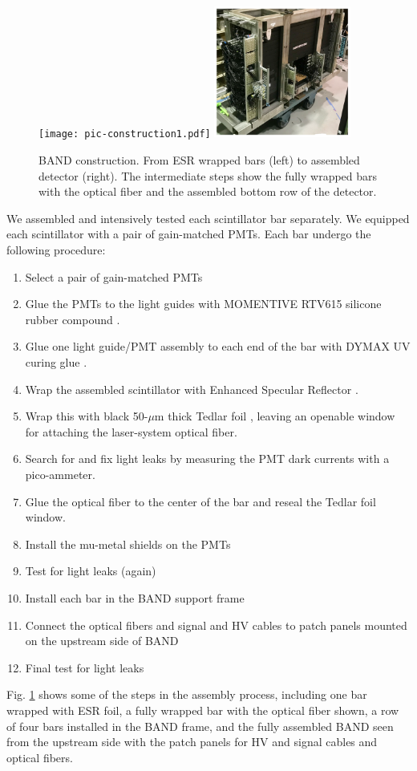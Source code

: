 \documentclass[3p,final,twocolumn]{elsarticle}
\begin{document}
\begin{figure}[tbp]
	\centering
	\texttt{[image: pic-construction1.pdf]}
	\includegraphics[width=0.40\textwidth , height=0.40\textwidth]{pic-construction2.pdf}
				\caption{BAND construction. From ESR \cite{3MESR} wrapped bars (left) to assembled detector (right). The intermediate steps show the fully wrapped bars with the optical fiber and the assembled bottom row of the detector.}
		\label{fig:barassembly}
\end{figure}

We assembled and intensively tested each scintillator bar
separately. We equipped each scintillator with a pair of gain-matched
PMTs.  Each bar undergo the following procedure:
\begin{enumerate}
\item Select a pair of gain-matched PMTs
\item Glue the PMTs to the light guides with MOMENTIVE RTV615 silicone rubber compound \cite{softglue}.
\item Glue one light guide/PMT assembly to each end of the bar with DYMAX
  UV curing glue \cite{uvglue}.
\item Wrap the assembled scintillator with Enhanced Specular Reflector \cite{3MESR}.
\item Wrap this with black 50-$\mu$m thick Tedlar foil \cite{tedlarfoil}, leaving an openable
  window for attaching the laser-system optical fiber.
\item Search for and fix light leaks by measuring the PMT dark currents with a pico-ammeter.
\item Glue the optical fiber to the center of the bar and reseal the Tedlar foil window.
\item Install the mu-metal shields on the PMTs 
\item Test for light leaks (again)
\item Install each bar in the BAND support frame
\item Connect the optical fibers and signal and HV cables to patch panels mounted on the upstream side of BAND
\item Final test for light leaks
\end{enumerate}
Fig. \ref{fig:barassembly} shows some of the steps in the assembly process,
including one bar wrapped with ESR foil, a fully wrapped bar with the
optical fiber shown, a row of four bars installed in the BAND frame,
and the fully assembled BAND seen from the upstream side with the
patch panels for HV and  signal cables and optical fibers.
\end{document}
